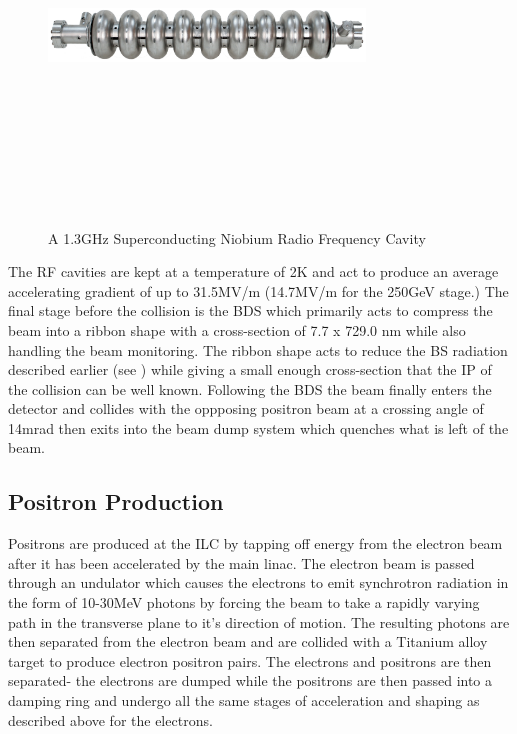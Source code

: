 \begin{figure}
  \centering
  \includegraphics[width=0.75\textwidth,height=10cm,keepaspectratio]{Experiments/fig/Cavity}
  \caption[Superconducting Cavities For The ILC]{A 1.3GHz Superconducting Niobium Radio Frequency Cavity \cite{ILCTDR}}
  \label{Fig:cavity}
\end{figure}
The \ac{RF} cavities are kept at a temperature of 2K and act to produce an average accelerating gradient of up to 31.5MV/m (14.7MV/m for the 250GeV stage.)  The final stage before the collision is the \ac{BDS} which primarily acts to compress the beam into a ribbon shape with a cross-section of 7.7 x 729.0 nm while also handling the beam monitoring. The ribbon shape acts to reduce the \ac{BS} radiation described earlier (see ) while giving a small enough cross-section that the \ac{IP} of the collision can be well known. Following the \ac{BDS} the beam finally enters the detector and collides with the oppposing positron beam at a crossing angle of 14mrad then exits into the beam dump system which quenches what is left of the beam.

\subsection{Positron Production}
Positrons are produced at the \ac{ILC} by tapping off energy from the electron beam after it has been accelerated by the main linac. The electron beam is passed through an undulator which causes the electrons to emit synchrotron radiation in the form of 10-30MeV photons by forcing the beam to take a rapidly varying path in the transverse plane to it's direction of motion. The resulting photons are then separated from the electron beam and are collided with a Titanium alloy target to produce electron positron pairs. The electrons and positrons are then separated- the electrons are dumped while the positrons are then passed into a damping ring and undergo all the same stages of acceleration and shaping as described above for the electrons.

